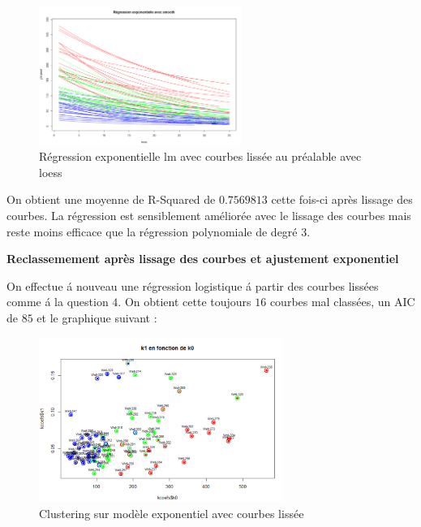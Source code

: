 \documentclass[12pt]{article}
\begin{document}
\begin{figure}[H]
 \centering %
	\includegraphics[width=250px]{reg_exp_smooth_loess}
  \caption{\label{fig:reg_exp_smooth_loess} R\'egression exponentielle lm avec courbes liss\'ee au pr\'ealable avec loess}
\end{figure}

On obtient une moyenne de R-Squared de $0.7569813$ cette fois-ci apr\`es lissage des courbes. La r\'egression est sensiblement am\'elior\'ee avec le lissage des courbes mais reste moins efficace que la r\'egression polynomiale de degr\'e 3.

\newpage

\textbf{Reclassemement apr\`es lissage des courbes et ajustement exponentiel}

On effectue \'a nouveau une r\'egression logistique \'a partir des courbes liss\'ees comme \'a la question $4$.
On obtient cette toujours $16$ courbes mal class\'ees, un AIC de $85$ et le graphique suivant : 

\begin{figure}[H]
 \centering %
	\includegraphics[width=300px]{smooth_clustering_exp}
  \caption{\label{fig:reg_exp_clust} Clustering sur mod\`ele exponentiel avec courbes liss\'ee}
\end{figure}
\end{document}
